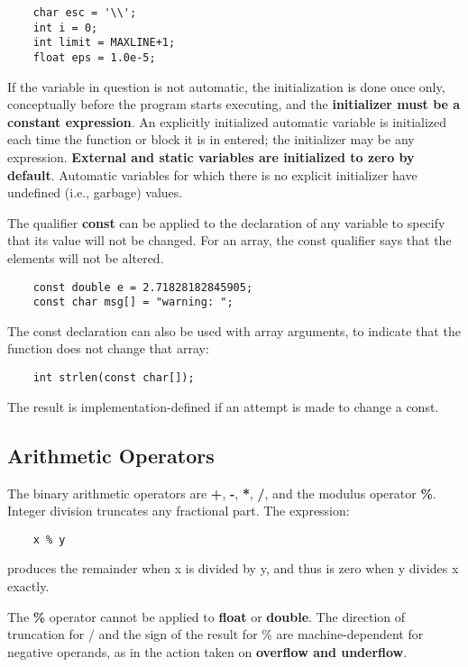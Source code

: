 \documentclass{article}
\begin{document}
\begin{lstlisting}
	char esc = '\\';
	int i = 0;
	int limit = MAXLINE+1;
	float eps = 1.0e-5;
\end{lstlisting}

If the variable in question is not automatic, the initialization is done once only, conceptually before the program starts executing, and the \textbf{initializer must be a constant expression}. An explicitly initialized automatic variable is initialized each time the function or block it is in entered; the initializer may be any expression. \textbf{External and static variables are initialized to zero by default}. Automatic variables for which there is no explicit initializer have undefined (i.e., garbage) values. 

The qualifier \textbf{const} can be applied to the declaration of any variable to specify that its value will not be changed. For an array, the const qualifier says that the elements will not be altered. 

\begin{lstlisting}
	const double e = 2.71828182845905;
	const char msg[] = "warning: ";
\end{lstlisting}

The const declaration can also be used with array arguments, to indicate that the function does not change that array:

\begin{lstlisting}
	int strlen(const char[]);
\end{lstlisting}

The result is implementation-defined if an attempt is made to change a const.

\subsection{Arithmetic Operators}

The binary arithmetic operators are \textbf{+}, \textbf{-}, \textbf{*}, \textbf{/}, and the modulus operator \textbf{\%}. Integer division truncates any fractional part. The expression:

\begin{lstlisting}
	x % y
\end{lstlisting}

produces the remainder when x is divided by y, and thus is zero when y divides x exactly.

The \textbf{\%} operator cannot be applied to \textbf{float} or \textbf{double}. The direction of truncation for / and the sign of the result for \% are machine-dependent for negative operands, as in the action taken on \textbf{overflow and underflow}.
\end{document}
